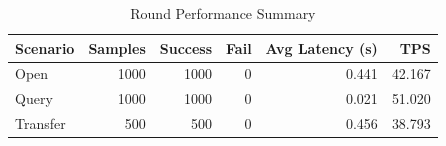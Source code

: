 \begin{table}
\caption{Round Performance Summary}
\label{tab:round_perf}
\begin{tabular}{lrrrrr}
\toprule
Scenario & Samples & Success & Fail & Avg Latency (s) & TPS \\
\midrule
Open & 1000 & 1000 & 0 & 0.441 & 42.167 \\
Query & 1000 & 1000 & 0 & 0.021 & 51.020 \\
Transfer & 500 & 500 & 0 & 0.456 & 38.793 \\
\bottomrule
\end{tabular}
\end{table}
